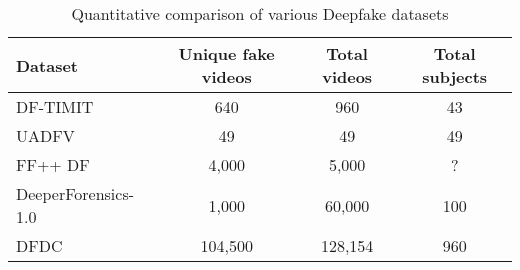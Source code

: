 \documentclass{article} %
\begin{document}
\begin{table}[ht]
\centering
\caption{Quantitative comparison of various Deepfake datasets}
\begin{tabular}{lccc}
\toprule
\textbf{Dataset} & \textbf{Unique fake videos} & \textbf{Total videos} & \textbf{Total subjects} \\ 
\midrule
DF-TIMIT         & 640     & 960     & 43   \\
UADFV            & 49      & 49      & 49   \\
FF++ DF          & 4,000   & 5,000   & ?    \\
DeeperForensics-1.0 & 1,000 & 60,000  & 100  \\
DFDC             & 104,500 & 128,154 & 960  \\
\bottomrule
\end{tabular}
\label{tab:deepfake_comparison}
\end{table}
\end{document}
